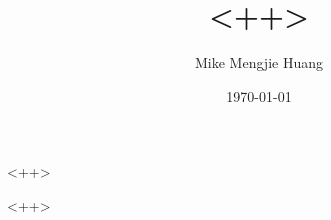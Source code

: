 \documentclass[xcolor=x11names,table]{beamer}
\title[<++>]
{<++>}
\author{Mike Mengjie Huang}
\institute[<++>]{<++>}
\date{\today}
\begin{document}
\begin{frame}
\titlepage
\end{frame}

\begin{frame}{<++>}
\tableofcontents
\end{frame}

<++>
\end{document}
